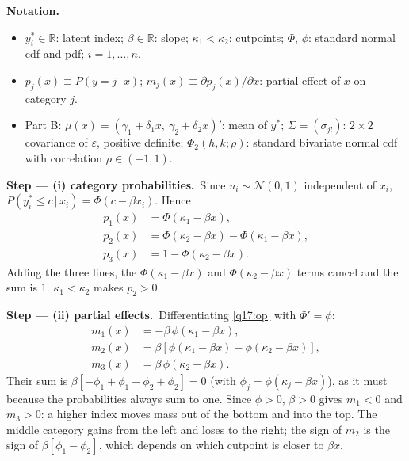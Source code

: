 \documentclass[11pt,a4paper]{article}
\numberwithin{equation}{questao}
\newenvironment{notacao}{\par\smallskip\noindent\textbf{Notation.}\begin{itemize}[leftmargin=1.4em,topsep=1pt,itemsep=0pt]\small}{\end{itemize}}
\newcommand{\passo}[2]{\par\smallskip\noindent\textbf{Step --- #1.}~#2}
\newcommand{\N}{\mathcal{N}}
\begin{document}
\begin{sol}
\begin{notacao}
\item $y_i^*\in\mathbb{R}$: latent index; $\beta\in\mathbb{R}$: slope; $\kappa_1<\kappa_2$: cutpoints; $\Phi$, $\phi$: standard normal cdf and pdf; $i=1,\dots,n$.
\item $p_j(x)\equiv P(y=j\,|\,x)$; $m_j(x)\equiv\partial p_j(x)/\partial x$: partial effect of $x$ on category $j$.
\item Part B: $\mu(x)=(\gamma_1+\delta_1x,\ \gamma_2+\delta_2x)'$: mean of $y^*$; $\Sigma=(\sigma_{jl})$: $2\times2$ covariance of $\varepsilon$, positive definite; $\Phi_2(h,k;\rho)$: standard bivariate normal cdf with correlation $\rho\in(-1,1)$.
\end{notacao}

\passo{(i) category probabilities}{Since $u_i\sim\N(0,1)$ independent of $x_i$, $P(y_i^*\le c\,|\,x_i)=\Phi(c-\beta x_i)$. Hence
\begin{align}
p_1(x)&=\Phi(\kappa_1-\beta x),\nonumber\\
p_2(x)&=\Phi(\kappa_2-\beta x)-\Phi(\kappa_1-\beta x), \label{q17:op}\\
p_3(x)&=1-\Phi(\kappa_2-\beta x).\nonumber
\end{align}
Adding the three lines, the $\Phi(\kappa_1-\beta x)$ and $\Phi(\kappa_2-\beta x)$ terms cancel and the sum is $1$.
$\kappa_1<\kappa_2$ makes $p_2>0$.}

\passo{(ii) partial effects}{Differentiating \eqref{q17:op} with $\Phi'=\phi$:
\begin{align}
m_1(x)&=-\beta\,\phi(\kappa_1-\beta x),\nonumber\\
m_2(x)&=\beta\left[\phi(\kappa_1-\beta x)-\phi(\kappa_2-\beta x)\right], \label{q17:me}\\
m_3(x)&=\beta\,\phi(\kappa_2-\beta x).\nonumber
\end{align}
Their sum is $\beta[-\phi_1+\phi_1-\phi_2+\phi_2]=0$ (with $\phi_j=\phi(\kappa_j-\beta x)$), as it must because the
probabilities always sum to one. Since $\phi>0$, $\beta>0$ gives $m_1<0$ and $m_3>0$: a higher index moves mass out of
the bottom and into the top. The middle category gains from the left and loses to the right; the sign of $m_2$
is the sign of $\beta[\phi_1-\phi_2]$, which depends on which cutpoint is closer to $\beta x$.

}
\end{sol}
\end{document}
